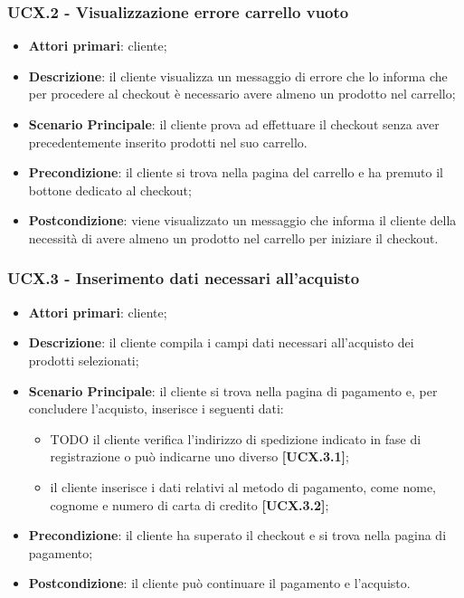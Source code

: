 \subsubsection{UCX.2 - Visualizzazione errore carrello vuoto}
\begin{itemize}
\item \textbf{Attori primari}: cliente;
\item \textbf{Descrizione}: il cliente visualizza un messaggio di errore che lo informa che per procedere al checkout è necessario avere almeno un prodotto nel carrello;
\item \textbf{Scenario Principale}: il cliente prova ad effettuare il checkout senza aver precedentemente inserito prodotti nel suo carrello.
\item \textbf{Precondizione}: il cliente si trova nella pagina del carrello e ha premuto il bottone dedicato al checkout;
\item \textbf{Postcondizione}: viene visualizzato un messaggio che informa il cliente della necessità di avere almeno un prodotto nel carrello per iniziare il checkout.
\end{itemize}

\subsubsection{UCX.3 - Inserimento dati necessari all'acquisto}
\begin{itemize}
\item \textbf{Attori primari}: cliente;
\item \textbf{Descrizione}: il cliente compila i campi dati necessari all'acquisto dei prodotti selezionati;
\item \textbf{Scenario Principale}: il cliente si trova nella pagina di pagamento e, per concludere l'acquisto, inserisce i seguenti dati:
\begin{itemize}
	\item TODO il cliente verifica l'indirizzo di spedizione indicato in fase di registrazione o può indicarne uno diverso \textbf{[UCX.3.1]};
	\item il cliente inserisce i dati relativi al metodo di pagamento, come nome, cognome e numero di carta di credito \textbf{[UCX.3.2]};
\end{itemize}
\item \textbf{Precondizione}: il cliente ha superato il checkout e si trova nella pagina di pagamento;
\item \textbf{Postcondizione}: il cliente può continuare il pagamento e l'acquisto.
\end{itemize}

